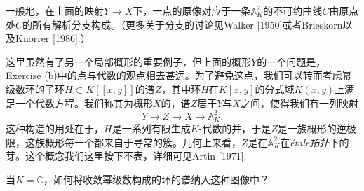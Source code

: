 一般地，在上面的映射$Y\to X$下，一点的原像对应于一条$\mathbb{A}_K^2$的不可约曲线$C$由原点处$C$的所有解析分支构成。（更多关于分支的讨论见Walker [1950]或者Brieskorn以及Kn\"{o}rrer [1986].）

这里虽然有了另一个局部概形的重要例子，但上面的概形$Y$的一个问题是，Exercise {\thethm}(b)中的点与代数的观点相去甚远。为了避免这点，我们可以转而考虑幂级数环的子环$H\subset K[\![x,y]\!]$的谱$Z$，其中环$H$在$K[x,y]$的分式域$K(x,y)$上满足一个代数方程。我们称其为概形$X$的，谱$Z$居于$Y$与$X$之间，使得我们有一列映射
\[
	Y\to Z\to X\to \mathbb{A}_K^2.
\]
这种构造的用处在于，$H$是一系列有限生成$K$\hyp 代数的并，于是$Z$是一族概形的逆极限，这族概形每一个都来自于寻常的簇。几何上来看，$Z$是在$\mathbb{A}_K^2$在\textit{\'{e}tale拓扑}下的芽。这个概念我们这里按下不表，详细可见Artin [1971].

\begin{exe}
	当$K=\mathbb{C}$，如何将收敛幂级数构成的环的谱纳入这种图像中？
\end{exe}